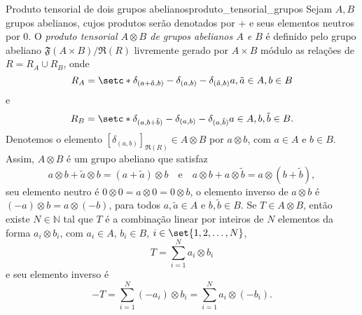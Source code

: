 \begin{proposition}{Produto tensorial de dois grupos abelianos}{produto_tensorial_grupos}
    Sejam \(A, B\) grupos abelianos, cujos produtos serão denotados por \(+\) e seus elementos neutros por \(0\). O \emph{produto tensorial \(A \otimes B\) de grupos abelianos \(A\) e \(B\)} é definido pelo grupo abeliano \(\mathfrak{F}(A \times B)/\mathfrak{R}(R)\) livremente gerado por \(A \times B\) módulo as relações de \(R = R_A \cup R_B\), onde
    \begin{equation*}
        R_A = \setc*{\delta_{(a + \tilde{a}, b)} - \delta_{(a,b)} - \delta_{(\tilde{a},b)}}{a, \tilde{a} \in A, b \in B}
    \end{equation*}
    e
    \begin{equation*}
        R_B = \setc*{\delta_{(a,b + \tilde{b})} - \delta_{(a,b)} - \delta_{(a,\tilde{b})}}{a \in A, b, \tilde{b} \in B}.
    \end{equation*}
    Denotemos o elemento \([\delta_{(a,b)}]_{\mathfrak{R}(R)} \in A \otimes B\) por \(a \otimes b\), com \(a\in A\) e \(b \in B\). Assim, \(A \otimes B\) é um grupo abeliano que satisfaz
    \begin{equation*}
        a \otimes b + \tilde{a} \otimes b = (a + \tilde{a}) \otimes b\quad\text{e}\quad
        a \otimes b + a \otimes \tilde{b} = a \otimes (b + \tilde{b}),
    \end{equation*}
    seu elemento neutro é \(0 \otimes 0 = a \otimes 0 = 0 \otimes b\), o elemento inverso de \(a \otimes b\) é \((-a) \otimes b = a \otimes (-b)\), para todos \(a,\tilde{a} \in A\) e \(b,\tilde{b} \in B\). Se \(T \in A \otimes B\), então existe \(N \in \mathbb{N}\) tal que \(T\) é a combinação linear por inteiros de \(N\) elementos da forma \(a_i \otimes b_i\), com \(a_i \in A\), \(b_i \in B\), \(i \in \set{1, 2,\dots, N}\),
    \begin{equation*}
        T = \sum_{i = 1}^N a_i \otimes b_i
    \end{equation*}
    e seu elemento inverso é
    \begin{equation*}
        -T = \sum_{i = 1}^N (-a_i) \otimes b_i = \sum_{i = 1}^N a_i \otimes (-b_i).
    \end{equation*}
\end{proposition}

